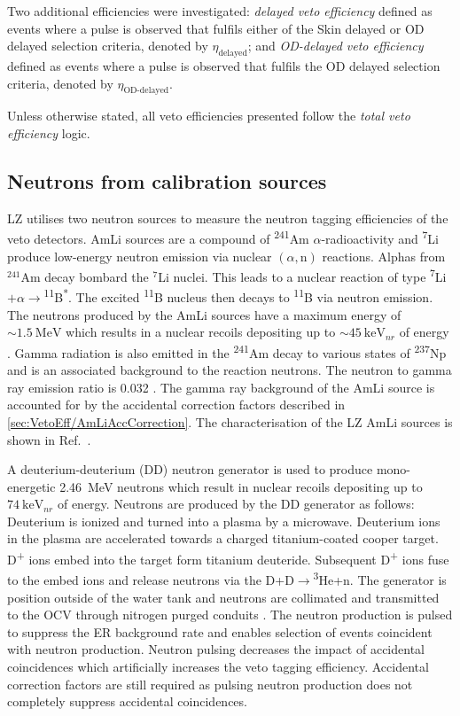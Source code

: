 Two additional efficiencies were investigated: \textit{delayed veto efficiency} defined as events where a pulse is observed that fulfils either of the Skin delayed or OD delayed selection criteria, denoted by $\eta_\text{delayed}$; and \textit{OD-delayed veto efficiency} defined as events where a pulse is observed that fulfils the OD delayed selection criteria, denoted by $\eta_\text{OD-delayed}$.

Unless otherwise stated, all veto efficiencies presented follow the \textit{total veto efficiency} logic.

\subsection{Neutrons from calibration sources}\label{sec:VetoEff/NeutronsFromCalibrationSources}
LZ utilises two neutron sources to measure the neutron tagging efficiencies of the veto detectors. AmLi sources are a compound of \textsuperscript{241}Am $\alpha$-radioactivity and \textsuperscript{7}Li produce low-energy neutron emission via nuclear $(\alpha,\text{n})$ reactions. Alphas from $^{241}$Am decay bombard the $^{7}$Li nuclei. This leads to a nuclear reaction of type \textsuperscript{7}Li$+\alpha \rightarrow$\textsuperscript{11}B\textsuperscript{*}. The excited \textsuperscript{11}B nucleus then decays to \textsuperscript{11}B via neutron emission. The neutrons produced by the AmLi sources have a maximum energy of $\sim1.5~\text{MeV}$ which results in a nuclear recoils depositing up to $\sim45~\text{keV}_{nr}$ of energy \cite{LZ:2024bsz}. Gamma radiation is also emitted in the \textsuperscript{241}Am decay to various states of \textsuperscript{237}Np and is an associated background to the reaction neutrons. The neutron to gamma ray emission ratio is 0.032 \cite{Sazzad:2023uqs}. The gamma ray background of the AmLi source is accounted for by the accidental correction factors described in \autoref{sec:VetoEff/AmLiAccCorrection}. The characterisation of the LZ AmLi sources is shown in Ref.~\cite{Sazzad:2023uqs}.

A deuterium-deuterium (DD) neutron generator is used to produce mono-energetic 2.46~MeV neutrons which result in nuclear recoils depositing up to $74~\text{keV}_{nr}$ of energy. Neutrons are produced by the DD generator as follows: Deuterium is ionized and turned into a plasma by a microwave. Deuterium ions in the plasma are accelerated towards a charged titanium-coated cooper target. D\textsuperscript{+} ions embed into the target form titanium deuteride. Subsequent D\textsuperscript{+} ions fuse to the embed ions and release neutrons via the D+D$\rightarrow$\textsuperscript{3}He+n. The generator is position outside of the water tank and neutrons are collimated and transmitted to the OCV through nitrogen purged conduits \cite{LZ:2024bsz}. The neutron production is pulsed to suppress the ER background rate and enables selection of events coincident with neutron production. Neutron pulsing decreases the impact of accidental coincidences which artificially increases the veto tagging efficiency. Accidental correction factors are still required as pulsing neutron production does not completely suppress accidental coincidences.

